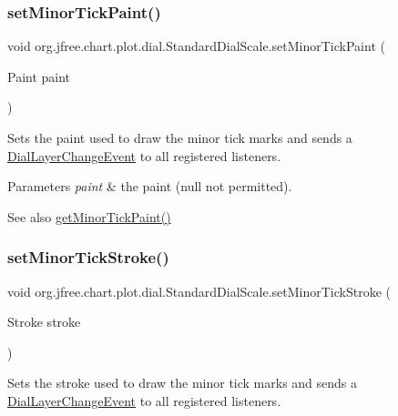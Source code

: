 \subsubsection{\texorpdfstring{set\+Minor\+Tick\+Paint()}{setMinorTickPaint()}}
{\footnotesize\ttfamily void org.\+jfree.\+chart.\+plot.\+dial.\+Standard\+Dial\+Scale.\+set\+Minor\+Tick\+Paint (\begin{DoxyParamCaption}\item[{Paint}]{paint }\end{DoxyParamCaption})}

Sets the paint used to draw the minor tick marks and sends a \mbox{\hyperlink{classorg_1_1jfree_1_1chart_1_1plot_1_1dial_1_1_dial_layer_change_event}{Dial\+Layer\+Change\+Event}} to all registered listeners.


\begin{DoxyParams}{Parameters}
{\em paint} & the paint ({\ttfamily null} not permitted).\\
\hline
\end{DoxyParams}
\begin{DoxySeeAlso}{See also}
\mbox{\hyperlink{classorg_1_1jfree_1_1chart_1_1plot_1_1dial_1_1_standard_dial_scale_a3ba7b8e13c817d68f981b5e918be5a41}{get\+Minor\+Tick\+Paint()}} 
\end{DoxySeeAlso}
\mbox{\label{classorg_1_1jfree_1_1chart_1_1plot_1_1dial_1_1_standard_dial_scale_a5fe083a0e5dfb8877002fbc2070b4d00}} 
\subsubsection{\texorpdfstring{set\+Minor\+Tick\+Stroke()}{setMinorTickStroke()}}
{\footnotesize\ttfamily void org.\+jfree.\+chart.\+plot.\+dial.\+Standard\+Dial\+Scale.\+set\+Minor\+Tick\+Stroke (\begin{DoxyParamCaption}\item[{Stroke}]{stroke }\end{DoxyParamCaption})}

Sets the stroke used to draw the minor tick marks and sends a \mbox{\hyperlink{classorg_1_1jfree_1_1chart_1_1plot_1_1dial_1_1_dial_layer_change_event}{Dial\+Layer\+Change\+Event}} to all registered listeners.


